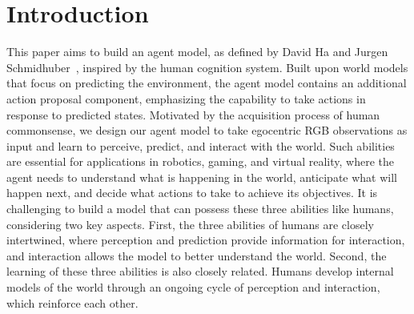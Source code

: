 \section{Introduction}
\label{sec:intro}


This paper aims to build an agent model, as defined by David Ha and Jurgen Schmidhuber~\cite{ha2018world}, inspired by the human cognition system.
Built upon world models that focus on predicting the environment, the agent model contains an additional action proposal component, emphasizing the capability to take actions in response to predicted states.
Motivated by the acquisition process of human commonsense, we design our agent model to take egocentric RGB observations as input and learn to perceive, predict, and interact with the world.
Such abilities are essential for applications in robotics, gaming, and virtual reality, where the agent needs to understand what is happening in the world, anticipate what will happen next, and decide what actions to take to achieve its objectives.
It is challenging to build a model that can possess these three abilities like humans, considering two key aspects.
First, the three abilities of humans are closely intertwined, where perception and prediction provide information for interaction, and interaction allows the model to better understand the world.
Second, the learning of these three abilities is also closely related. Humans develop internal models of the world through an ongoing cycle of perception and interaction, which reinforce each other.

